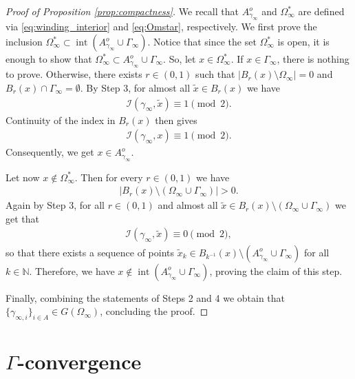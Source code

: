 \documentclass[11pt]{article}
\newcounter{statement}
\numberwithin{statement}{section}
\numberwithin{equation}{section}
\theoremstyle{remark}
\newcommand{\N}{\mathbb N}
\begin{document}
\begin{proof}[Proof of Proposition \ref{prop:compactness}]
        We recall that $A_{\gamma_\infty}^o$ and
          $\Omega_\infty^*$ are defined via
          \eqref{eq:winding_interior} and \eqref{eq:Omstar},
          respectively. We first prove the inclusion
        $\Omega_\infty^* \subset
        \operatorname{int}\left(A_{\gamma_\infty}^o \cup
          \Gamma_\infty \right)$. Notice that since the set
          $\Omega_\infty^*$ is open, it is enough to show that
          $\Omega_\infty^* \subset A_{\gamma_\infty}^o \cup
          \Gamma_\infty$. So, let $x\in \Omega_\infty^*$.  If
        $x\in \Gamma_\infty$, there is nothing to prove. Otherwise,
        there exists $r \in (0,1)$ such that
        $|B_r(x) \setminus \Omega_\infty |=0$ and
        $B_{ r}(x) \cap \Gamma_\infty = \emptyset$.  By Step 3, for
        almost all $\tilde x \in B_r(x)$ we have
	\begin{align}
          \mathcal{I}(\gamma_\infty, \tilde x) \equiv 1 \pmod{2}.
	\end{align}
	Continuity of the index in $B_{ r}(x)$ then gives
	\begin{align}
          \mathcal{I}(\gamma_\infty, x) \equiv 1 \pmod{2}.
	\end{align}
	Consequently, we get $x \in A_{\gamma_\infty}^o$.
	
	Let now $x \not\in \Omega_\infty^*$.
	Then for every $r \in (0,1)$ we have
	\begin{align}
		 |B_r(x)\setminus (\Omega_\infty \cup \Gamma_\infty) | >0.
	\end{align}
	Again by Step 3, for all $r \in (0,1)$ and almost all
        $\tilde x \in B_r(x)\setminus ( \Omega_\infty \cup
        \Gamma_\infty) $ we get that
	\begin{align}
		\mathcal{I}(\gamma_\infty, \tilde x) \equiv 0  \pmod{2},
	\end{align}
	so that there exists a sequence of points
        $\tilde x_k \in B_{k^{-1}}(x)\setminus
        \left(A_{\gamma_\infty}^o \cup \Gamma_\infty\right)$ for
        all $k \in \N$. Therefore, we have
        $x \not\in \operatorname{int}\left( A_{\gamma_\infty}^o
          \cup \Gamma_\infty\right)$, proving the claim of this
        step.
	
	Finally, combining the statements of Steps 2 and 4 we
          obtain that
        $\{\gamma_{\infty,i}\}_{i \in A} \in G(\Omega_\infty)$,
          concluding the proof.
\end{proof}
	
\section{$\Gamma$-convergence} \label{sec:Gamma}
\end{document}
